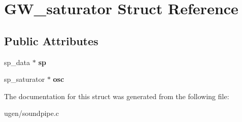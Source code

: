 \hypertarget{structGW__saturator}{}\section{G\+W\+\_\+saturator Struct Reference}
\label{structGW__saturator}
\subsection*{Public Attributes}
\begin{DoxyCompactItemize}
\item 
\hypertarget{structGW__saturator_a53ad45814838bb4a5a0bdb6e5afcdd69}{}\label{structGW__saturator_a53ad45814838bb4a5a0bdb6e5afcdd69} 
sp\+\_\+data $\ast$ {\bfseries sp}
\item 
\hypertarget{structGW__saturator_a27b7c893339b9f20dcdd3bd5fc96656d}{}\label{structGW__saturator_a27b7c893339b9f20dcdd3bd5fc96656d} 
sp\+\_\+saturator $\ast$ {\bfseries osc}
\end{DoxyCompactItemize}


The documentation for this struct was generated from the following file\+:\begin{DoxyCompactItemize}
\item 
ugen/soundpipe.\+c\end{DoxyCompactItemize}
